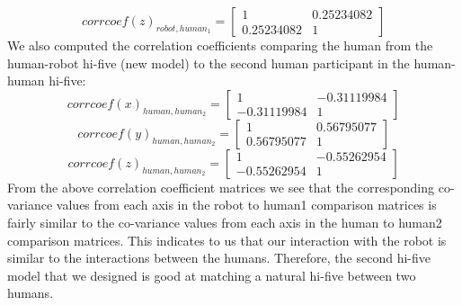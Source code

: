 \documentclass[letterpaper, 10 pt, conference]{ieeeconf}  %
\begin{document}
\newline
\[
corrcoef(z)_{robot, human_1} = \begin{bmatrix}
	1 & 0.25234082 \\
	0.25234082 & 1
\end{bmatrix}
\]
\newline
We also computed the correlation coefficients comparing the human from the human-robot hi-five (new model) to the second human participant in the human-human hi-five:
\[
corrcoef(x)_{human, human_2} = \begin{bmatrix}
1 & -0.31119984 \\
-0.31119984 & 1
\end{bmatrix}
\]
\newline
\[
corrcoef(y)_{human, human_2} = \begin{bmatrix}
1 & 0.56795077 \\
0.56795077 & 1
\end{bmatrix}
\]
\newline
\[
corrcoef(z)_{human, human_2} = \begin{bmatrix}
1 & -0.55262954 \\
-0.55262954 & 1
\end{bmatrix}
\]
\newline
From the above correlation coefficient matrices we see that the corresponding co-variance values from each axis in the robot to human1 comparison matrices is fairly similar to the co-variance values from each axis in the human to human2 comparison matrices. This indicates to us that our interaction with the robot is similar to the interactions between the humans. Therefore, the second hi-five model that we designed is good at matching a natural hi-five between two humans.
\end{document}
